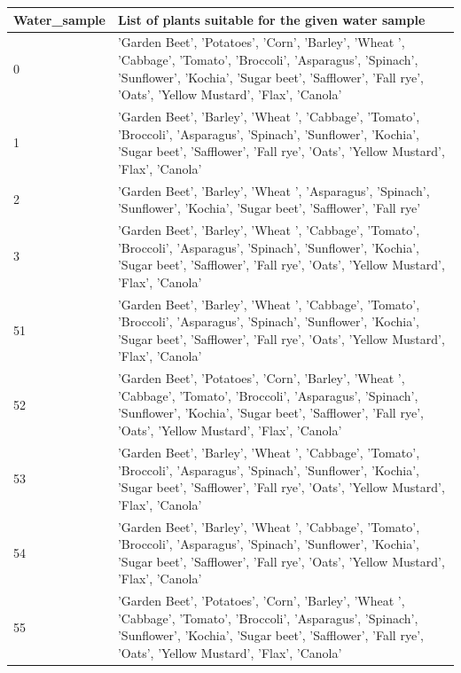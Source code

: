 \begin{table}[H]
    \centering
    \begin{tabular}{|m{}|m{}|}
    \hline
        \textbf{Water\_sample} & \textbf{List of plants suitable for the given water sample} \\ \hline
        0 & 'Garden Beet', 'Potatoes', 'Corn', 'Barley', 'Wheat ', 'Cabbage', 'Tomato', 'Broccoli', 'Asparagus', 'Spinach', 'Sunflower', 'Kochia', 'Sugar beet', 'Safflower', 'Fall rye', 'Oats', 'Yellow Mustard', 'Flax', 'Canola' \\ \hline
        1 & 'Garden Beet', 'Barley', 'Wheat ', 'Cabbage', 'Tomato', 'Broccoli', 'Asparagus', 'Spinach', 'Sunflower', 'Kochia', 'Sugar beet', 'Safflower', 'Fall rye', 'Oats', 'Yellow Mustard', 'Flax', 'Canola' \\ \hline
        2 & 'Garden Beet', 'Barley', 'Wheat ', 'Asparagus', 'Spinach', 'Sunflower', 'Kochia', 'Sugar beet', 'Safflower', 'Fall rye' \\ \hline
        3 & 'Garden Beet', 'Barley', 'Wheat ', 'Cabbage', 'Tomato', 'Broccoli', 'Asparagus', 'Spinach', 'Sunflower', 'Kochia', 'Sugar beet', 'Safflower', 'Fall rye', 'Oats', 'Yellow Mustard', 'Flax', 'Canola' \\ \hline
        51 & 'Garden Beet', 'Barley', 'Wheat ', 'Cabbage', 'Tomato', 'Broccoli', 'Asparagus', 'Spinach', 'Sunflower', 'Kochia', 'Sugar beet', 'Safflower', 'Fall rye', 'Oats', 'Yellow Mustard', 'Flax', 'Canola' \\ \hline
        52 & 'Garden Beet', 'Potatoes', 'Corn', 'Barley', 'Wheat ', 'Cabbage', 'Tomato', 'Broccoli', 'Asparagus', 'Spinach', 'Sunflower', 'Kochia', 'Sugar beet', 'Safflower', 'Fall rye', 'Oats', 'Yellow Mustard', 'Flax', 'Canola' \\ \hline
        53 & 'Garden Beet', 'Barley', 'Wheat ', 'Cabbage', 'Tomato', 'Broccoli', 'Asparagus', 'Spinach', 'Sunflower', 'Kochia', 'Sugar beet', 'Safflower', 'Fall rye', 'Oats', 'Yellow Mustard', 'Flax', 'Canola' \\ \hline
        54 & 'Garden Beet', 'Barley', 'Wheat ', 'Cabbage', 'Tomato', 'Broccoli', 'Asparagus', 'Spinach', 'Sunflower', 'Kochia', 'Sugar beet', 'Safflower', 'Fall rye', 'Oats', 'Yellow Mustard', 'Flax', 'Canola' \\ \hline
        55 & 'Garden Beet', 'Potatoes', 'Corn', 'Barley', 'Wheat ', 'Cabbage', 'Tomato', 'Broccoli', 'Asparagus', 'Spinach', 'Sunflower', 'Kochia', 'Sugar beet', 'Safflower', 'Fall rye', 'Oats', 'Yellow Mustard', 'Flax', 'Canola' \\ \hline

\end{tabular}
\end{table}
